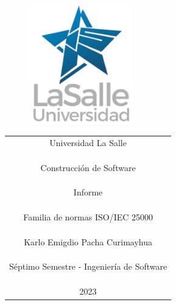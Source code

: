 \documentclass[https://www.overleaf.com/project/63761df255a8a9f4a15c3579
	letterpaper, %
	10pt, %
]{CSUniSchoolLabReport}
\begin{document}
    
    \begin{figure}[H] %
    	\centering %
    	\includegraphics[width=0.4\textwidth]{images/logo.png} %
    \end{figure}
    
    \begin{center}
        \begin{tabular} {c}
            \Huge Universidad La Salle \\\\\\\\
            \huge Construcción de Software \\\\\\\\
            \LARGE Informe \\\\\\\\
            \huge Familia de normas ISO/IEC 25000 \\\\\\\\
            \LARGE Karlo Emigdio Pacha Curimayhua \\\\\\\\
            \LARGE Séptimo Semestre - Ingeniería de Software \\\\\\\\
            \LARGE 2023
          \end{tabular}
    \end{center}
    
    \begin{center}
    	\begin{tabular}{l r}
    	\end{tabular}
    \end{center}
    
\end{document}
